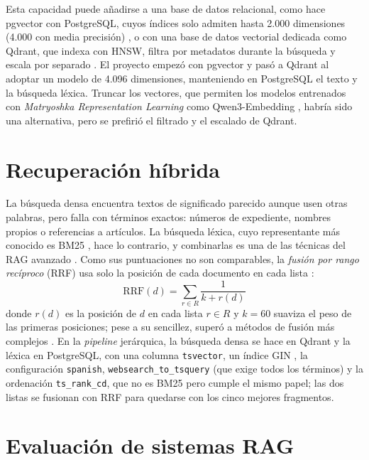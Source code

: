 Esta capacidad puede añadirse a una base de datos relacional, como hace pgvector con PostgreSQL, cuyos índices solo admiten hasta 2.000 dimensiones (4.000 con media precisión) \cite{pgvector}, o con una base de datos vectorial dedicada como Qdrant, que indexa con HNSW, filtra por metadatos durante la búsqueda y escala por separado \cite{qdrant}. El proyecto empezó con pgvector y pasó a Qdrant al adoptar un modelo de 4.096 dimensiones, manteniendo en PostgreSQL el texto y la búsqueda léxica. Truncar los vectores, que permiten los modelos entrenados con \emph{Matryoshka Representation Learning} como Qwen3-Embedding \cite{kusupati2022matryoshka,zhang2025qwen3emb}, habría sido una alternativa, pero se prefirió el filtrado y el escalado de Qdrant.

\section{Recuperación híbrida}
\label{sec:hibrida}

La búsqueda densa encuentra textos de significado parecido aunque usen otras palabras, pero falla con términos exactos: números de expediente, nombres propios o referencias a artículos. La búsqueda léxica, cuyo representante más conocido es BM25 \cite{robertson2009}, hace lo contrario, y combinarlas es una de las técnicas del RAG avanzado \cite{gao2023}. Como sus puntuaciones no son comparables, la \emph{fusión por rango recíproco} (RRF) usa solo la posición de cada documento en cada lista \cite{cormack2009}:
\begin{equation}
  \mathrm{RRF}(d) = \sum_{r \in R} \frac{1}{k + r(d)}
  \label{eq:rrf}
\end{equation}
donde $r(d)$ es la posición de $d$ en cada lista $r \in R$ y $k = 60$ suaviza el peso de las primeras posiciones; pese a su sencillez, superó a métodos de fusión más complejos \cite{cormack2009}. En la \emph{pipeline} jerárquica, la búsqueda densa se hace en Qdrant y la léxica en PostgreSQL, con una columna \texttt{tsvector}, un índice GIN \cite{postgresfts}, la configuración \texttt{spanish}, \texttt{websearch\_to\_tsquery} (que exige todos los términos) y la ordenación \texttt{ts\_rank\_cd}, que no es BM25 pero cumple el mismo papel; las dos listas se fusionan con RRF para quedarse con los cinco mejores fragmentos.

\section{Evaluación de sistemas RAG}
\label{sec:evaluacion-rag}

